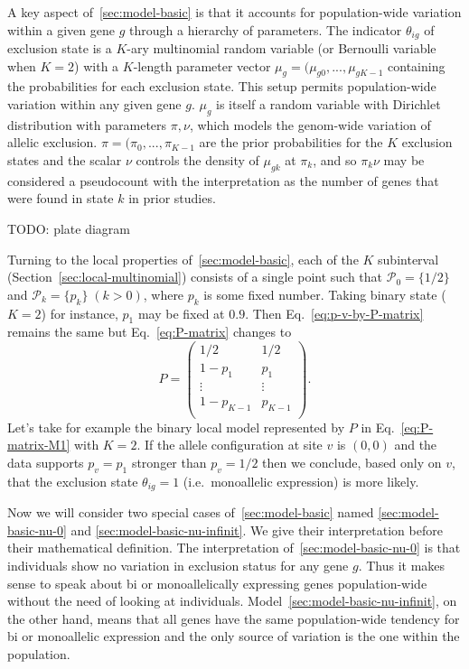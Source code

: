 \documentclass[letterpaper]{article}
\begin{document}
A key aspect of~\ref{sec:model-basic} is that it accounts for population-wide
variation within a given gene \(g\) through a hierarchy of parameters.  The
indicator \(\theta_{ig}\) of exclusion state is a \(K\)-ary multinomial random
variable (or Bernoulli variable when \(K=2\)) with a \(K\)-length parameter
vector \(\mu_g=(\mu_{g0},...,\mu_{gK-1}\) containing the probabilities for
each exclusion state.  This setup permits population-wide variation within any
given gene \(g\).  \(\mu_g\) is itself a random variable with Dirichlet
distribution with parameters \(\pi,\nu\), which models the genom-wide
variation of allelic exclusion.  \(\pi=(\pi_0,...,\pi_{K-1}\) are the prior
probabilities for the \(K\) exclusion states and the scalar \(\nu\) controls
the density of \(\mu_{gk}\) at \(\pi_k\), and so \(\pi_k \nu\) may be
considered a pseudocount with the interpretation as the number of genes that
were found in state \(k\) in prior studies.

TODO: plate diagram

Turning to the local properties of~\ref{sec:model-basic}, each of the \(K\)
subinterval (Section~\ref{sec:local-multinomial}) consists of a single point
such that \(\mathcal{P}_0 = \{1/2\}\) and \(\mathcal{P}_k = \{p_k\} \;
(k>0)\), where \(p_k\) is some fixed number.  Taking binary state (\(K=2\))
for instance, \(p_1\) may be fixed at \(0.9\).  Then
Eq.~\ref{eq:p-v-by-P-matrix} remains the same but Eq.~\ref{eq:P-matrix}
changes to
\begin{equation}
\label{eq:P-matrix-M1}
P =
\begin{pmatrix}
1/2 & 1/2 \\
1-p_1 & p_1 \\
\vdots & \vdots \\
1-p_{K-1} & p_{K-1} \\
\end{pmatrix}.
\end{equation}
Let's take for example the binary local model represented by \(P\) in
Eq.~\ref{eq:P-matrix-M1} with \(K=2\).  If the allele configuration at site \(v\) is
\((0,0)\) and the data supports \(p_v=p_1\) stronger than \(p_v=1/2\) then we
conclude, based only on \(v\), that the exclusion state \(\theta_{ig}=1\)
(i.e.~monoallelic expression) is more likely.

Now we will consider two special cases of~\ref{sec:model-basic} named
\ref{sec:model-basic-nu-0} and \ref{sec:model-basic-nu-infinit}.  We give
their interpretation before their mathematical definition.  The interpretation
of~\ref{sec:model-basic-nu-0} is that individuals show no variation in
exclusion status for any gene \(g\).  Thus it makes sense to speak about bi or
monoallelically expressing genes population-wide without the need of looking
at individuals.  Model~\ref{sec:model-basic-nu-infinit}, on the other hand,
means that all genes have the same population-wide tendency for bi or
monoallelic expression and the only source of variation is the one within the
population.
\end{document}
